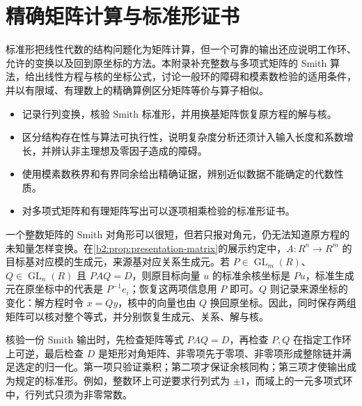 
\chapter{精确矩阵计算与标准形证书}
\label{b2:app:A}

\begin{chapterabstract}
	标准形把线性代数的结构问题化为矩阵计算，但一个可靠的输出还应说明工作环、允许的变换以及回到原坐标的方法。本附录补充整数与多项式矩阵的 Smith 算法，给出线性方程与核的坐标公式，讨论一般环的障碍和模素数检验的适用条件，并以有限域、有理数上的精确算例区分矩阵等价与算子相似。
\end{chapterabstract}

\begin{learninggoals}
	\begin{itemize}
		\item 记录行列变换，核验 Smith 标准形，并用换基矩阵恢复原方程的解与核。
		\item 区分结构存在性与算法可执行性，说明复杂度分析还须计入输入长度和系数增长，并辨认非主理想及零因子造成的障碍。
		\item 使用模素数秩界和有界同余给出精确证据，辨别近似数据不能确定的代数性质。
		\item 对多项式矩阵和有理矩阵写出可以逐项相乘检验的标准形证书。
	\end{itemize}
\end{learninggoals}

一个整数矩阵的 Smith 对角形可以很短，但若只报对角元，仍无法知道原方程的未知量怎样变换。在\cref{b2:prop:presentation-matrix}的展示约定中，\(A:R^n\to R^m\) 的目标基对应模的生成元，来源基对应关系生成元。若 \(P\in\operatorname{GL}_m(R)\)、\(Q\in\operatorname{GL}_n(R)\) 且 \(PAQ=D\)，则原目标向量 \(u\) 的标准余核坐标是 \(Pu\)，标准生成元在原坐标中的代表是 \(P^{-1}e_i\)；恢复这两项信息用 \(P\) 即可。\(Q\) 则记录来源坐标的变化：解方程时令 \(x=Qy\)，核中的向量也由 \(Q\) 换回原坐标。因此，同时保存两组矩阵可以核对整个等式，并分别恢复生成元、关系、解与核。

\ProseParagraphBreak

核验一份 Smith 输出时，先检查矩阵等式 \(PAQ=D\)，再检查 \(P,Q\) 在指定工作环上可逆，最后检查 \(D\) 是矩形对角矩阵、非零项先于零项、非零项形成整除链并满足选定的归一化。第一项只验证乘积；第二项才保证余核同构；第三项才使输出成为规定的标准形。例如，整数环上可逆要求行列式为 \(\pm1\)，而域上的一元多项式环中，行列式只须为非零常数。

